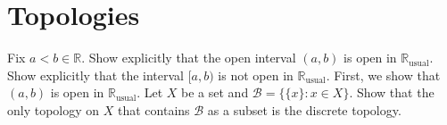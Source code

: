 \chapter{Topologies}

\begin{ExerciseList}
	\Exercise{}
		Fix $a<b\in\mathbb{R}$. Show explicitly that the open interval $(a,b)$ is open in $\mathbb{R}_{\text{usual}}$. Show explicitly
		that the interval $[a,b)$ is not open in $\mathbb{R}_{\text{usual}}$.
	\Answer First, we show that $(a, b)$ is open in $\mathbb{R}_{\text{usual}}$.
    \Exercise{}
        Let $X$ be a set and $\mathcal{B} = \{ \{x\}: x\in X\}$. Show that the only topology on $X$ that contains $\mathcal{B}$ %
        as a subset is the discrete topology.
\end{ExerciseList}
